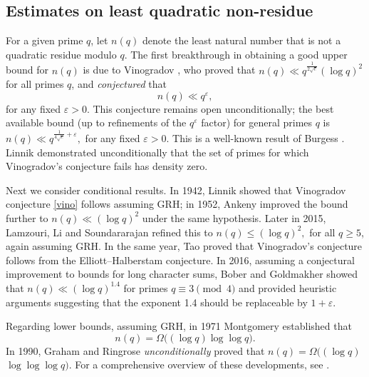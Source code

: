 \documentclass[pdflatex]{sn-jnl}%
\newcommand{\eps}{\ensuremath{\varepsilon}}
\theoremstyle{sltheorems}
\theoremstyle{plainrem}
\theoremstyle{definition}
\begin{document}
\subsection{Estimates on least quadratic non-residue}
For a given prime $q$, let $n(q)$ denote the least natural number that is not a quadratic
residue modulo $q$.  
The first breakthrough in obtaining a good upper bound for  $n(q)$ is
due to Vinogradov \cite{Vino1985}, 
who proved that
\(
n(q) \ll q^{\frac{1}{2\sqrt{e}}} (\log q)^2
\)
for all primes $q$, and \emph{conjectured} that
\begin{equation}\label{vino}
  n(q) \ll q^{\eps},
\end{equation}
for any fixed $\eps>0$.
This conjecture remains open unconditionally; the best
available bound (up to refinements of the $q^{\eps}$ factor) 
for general primes $q$ is
\(
n(q) \ll q^{\frac{1}{4\sqrt{e}}+ \eps},
\)
for any fixed $\eps > 0$. This is a well-known result of Burgess \cite{Burgess1957}.
  Linnik \cite{Linnik1942} demonstrated unconditionally that
the set of primes for which Vinogradov’s conjecture fails has density zero.

Next we consider conditional results.
In 1942, Linnik \cite{Linnik1942} showed that Vinogradov conjecture \eqref{vino} 
follows assuming GRH; in 1952, Ankeny \cite{ankeny} improved the bound further to
\(
n(q) \ll (\log q)^2
\)
under the same hypothesis.
Later in 2015, Lamzouri, Li and
Soundararajan \cite[Corollary 1.1]{LamzouriLS2015} refined this to
\(
n(q) \le (\log q)^2,
\)
for all $q  \ge  5$, again assuming GRH.
In the same year, Tao  \cite{Tao2015} 
proved that Vinogradov’s conjecture follows from the Elliott--Halberstam conjecture.
In 2016, assuming a conjectural improvement to bounds for long character sums, Bober and Goldmakher \cite{Bobgold} showed that 
$
n(q) \ll (\log q)^{1.4}
$
for primes $q \equiv 3 \pmod{4}$ and provided heuristic arguments suggesting that the exponent 1.4 should be replaceable by $1+\eps$.



Regarding lower bounds, assuming GRH, in 1971
Montgomery \cite[Theorem 13.15]{Montbook}  established that
\begin{equation*}
n(q) = \Omega\bigl( (\log q) \log \log q\bigr).
\end{equation*}
In 1990, Graham and Ringrose \cite{GrahamR1990} \emph{unconditionally} proved that
\(
n(q) = \Omega\bigl( (\log q) \) \(\log \log \log q\bigr).
\) 
%
For a comprehensive overview of these developments, see \cite{MC2019}.
\end{document}
